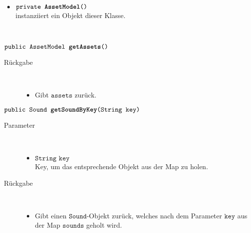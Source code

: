 \begin{description}
\begin{itemize}
		\end{itemize}
	
\item[Konstruktoren] \hfill \\
	\vspace{-.8cm}
	\begin{itemize}
		\item $\texttt{private \textbf{AssetModel}()}$ \\ instanziiert ein Objekt dieser Klasse.

	\end{itemize}
	
\item[Methoden] \hfill \\
	\vspace{-.8cm}
		\item $\texttt{public AssetModel \textbf{getAssets}()}$ \\ 
		\begin{description}
			\item[Rückgabe] \hfill \\
			\vspace{-.8cm}
			\begin{itemize}
				\item Gibt $\texttt{assets}$ zurück.
			\end{itemize}
			\end{description}
	
		\item $\texttt{public Sound \textbf{getSoundByKey}(String key)}$ \\ 
		\begin{description}
			\item[Parameter] \hfill \\
			\vspace{-.8cm}
			\begin{itemize}
				\item $\texttt{String key}$ \\ Key, um das entsprechende Objekt aus der Map zu holen.
			\end{itemize}
			\item[Rückgabe] \hfill \\
			\vspace{-.8cm}
			\begin{itemize}
				\item Gibt einen $\texttt{Sound}$-Objekt zurück, welches nach dem Parameter $\texttt{key}$ aus der Map $\texttt{sounds}$ geholt wird.
			\end{itemize}
			\end{description}
			

\end{description}
